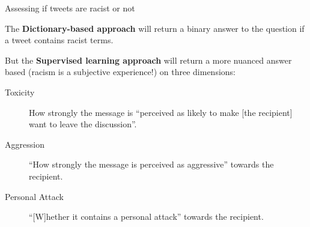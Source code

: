 \documentclass[serif, aspectratio=169]{beamer}
\begin{document}
\begin{frame}
{Assessing if tweets are racist or not}

The \textbf{Dictionary-based approach} will return a binary answer to the question if a tweet contains racist terms. 

But the \textbf{Supervised learning approach} will return a more nuanced answer based (racism is a subjective experience!) on three dimensions: 

\begin{description}

\item[Toxicity] How strongly the message is \enquote{perceived as likely to make [the recipient] want to leave the discussion}.

\item[Aggression] \enquote{How strongly the message is perceived as aggressive} towards the recipient.

\item[Personal Attack] \enquote{[W]hether it contains a personal attack} towards the recipient.

\end{description}

\end{frame}


\begin{frame}[allowframebreaks]
\printbibliography
\end{frame}
\end{document}
